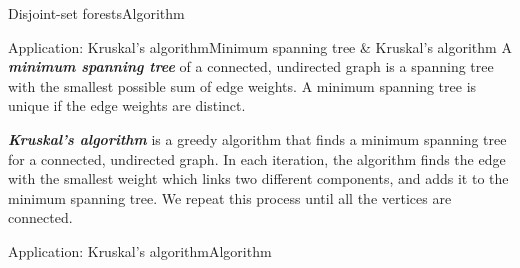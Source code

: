 \documentclass[aspectratio=169]{ctexbeamer}
\newcommand{\highlight}[1]{\textbf{\textit{#1}}}
\begin{document}
    \begin{frame}{Disjoint-set forests}{Algorithm}
        \small
        \begin{algorithm}[H]
            \caption{Disjoint-set forests}

            \BlankLine
    
        \end{algorithm}
    \end{frame}

    \begin{frame}{Application: Kruskal's algorithm}{Minimum spanning tree \& Kruskal's algorithm}
        A \highlight{minimum spanning tree} of a connected, undirected graph is a spanning tree with the smallest possible sum of edge weights. A minimum spanning tree is unique if the edge weights are distinct.

        \highlight{Kruskal's algorithm} is a greedy algorithm that finds a minimum spanning tree for a connected, undirected graph. In each iteration, the algorithm finds the edge with the smallest weight which links two different components, and adds it to the minimum spanning tree. We repeat this process until all the vertices are connected.
    \end{frame}

    \begin{frame}{Application: Kruskal's algorithm}{Algorithm}
        \footnotesize
        \begin{algorithm}[H]
            \caption{Kruskal's algorithm}
            \label{algo:Kruskal's algorithm}
    
    
        \end{algorithm}
    \end{frame}

    \appendix

    \begin{frame}
        \calligra \centering
        \scalebox{3}{
            Thanks for your attention!
        }
    \end{frame}
\end{document}
